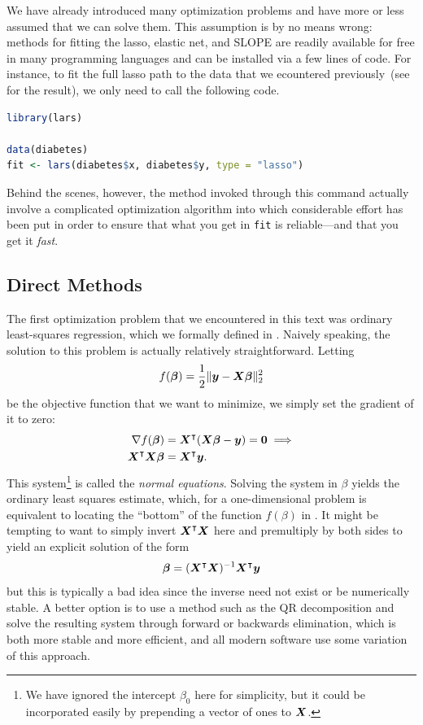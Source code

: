 We have already introduced many optimization problems and have more or less assumed that we can solve them. This assumption is by no means wrong: methods for fitting the lasso, elastic net, and SLOPE are readily available for free in many programming languages and can be installed via a few lines of code. For instance, to fit the full lasso path to the  data that we ecountered previously~(see  for the result), we only need to call the following  code.

\begin{lstlisting}[language=R]
library(lars)

data(diabetes)
fit <- lars(diabetes$x, diabetes$y, type = "lasso")
\end{lstlisting}

Behind the scenes, however, the method invoked through this command actually involve a complicated optimization algorithm into which considerable effort has been put in order to ensure that what you get in \texttt{fit} is reliable---and that you get it \emph{fast}.

\subsection{Direct Methods}

The first optimization problem that we encountered in this text was ordinary least-squares regression, which we formally defined in . Naively speaking, the solution to this problem is actually relatively straightforward. Letting
\[
  f(\boldsymbol{\beta}) = \frac{1}{2}\lVert \boldsymbol{y} - \boldsymbol{X}\boldsymbol{\beta}\rVert_2^2
\]
be the objective function that we want to minimize, we simply set the gradient of it to zero:
\[
  \begin{aligned}
    \nabla f(\boldsymbol{\beta})                & = \boldsymbol{X}^\intercal (\boldsymbol{X}\boldsymbol{\beta} - \boldsymbol{y}) = \boldsymbol{0} \implies \\
    \boldsymbol{X}^\intercal \boldsymbol{X}\boldsymbol{\beta} & = \boldsymbol{X}^\intercal \boldsymbol{y}.
  \end{aligned}
\]
This system\footnote{We have ignored the intercept \(\beta_0\) here for simplicity, but it could be incorporated easily by prepending a vector of ones to \(\boldsymbol{X}\).} is called the \emph{normal equations}. Solving the system in \(\beta\) yields the ordinary least squares estimate, which, for a one-dimensional problem is equivalent to locating the ``bottom'' of the function \(f(\beta)\) in . It might be tempting to want to simply invert \(\boldsymbol{X}^\intercal\boldsymbol{X}\) here and premultiply by both sides to yield an explicit solution of the form
\[
  \boldsymbol{\beta} = (\boldsymbol{X}^\intercal\boldsymbol{X})^{-1}\boldsymbol{X}^\intercal\boldsymbol{y}
\]
but this is typically a bad idea since the inverse need not exist or be numerically stable. A better option is to use a method such as the QR decomposition and solve the resulting system through forward or backwards elimination, which is both more stable and more efficient, and all modern software use some variation of this approach.

